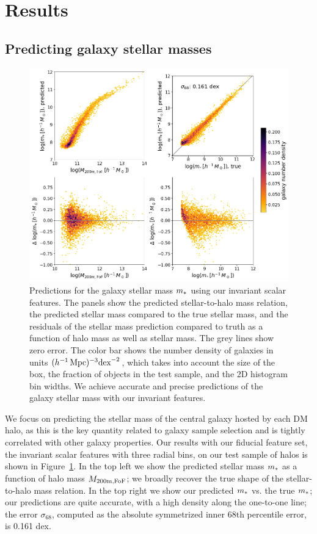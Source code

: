 \section{Results}
\label{sec:results}

\subsection{Predicting galaxy stellar masses}
\label{sec:pred_mstellar}

\begin{figure}
    \centering
    \includegraphics[width=0.7\columnwidth]{pred_mstellar.png}
    \caption{Predictions for the galaxy stellar mass $m_*$ using our invariant scalar features. The panels show the predicted stellar-to-halo mass relation, the predicted stellar mass compared to the true stellar mass, and the residuals of the stellar mass prediction compared to truth as a function of halo mass as well as stellar mass. The grey lines show zero error. The color bar shows the number density of galaxies in units $(h^{-1}\,\mathrm{Mpc})^{-3} \text{dex}^{-2}$, which takes into account the size of the box, the fraction of objects in the test sample, and the 2D histogram bin widths. We achieve accurate and precise predictions of the galaxy stellar mass with our invariant features.}
    \label{fig:mstellar}
\end{figure}

We focus on predicting the stellar mass of the central galaxy hosted by each DM halo, as this is the key quantity related to galaxy sample selection and is tightly correlated with other galaxy properties.
Our results with our fiducial feature set, the invariant scalar features with three radial bins, on our test sample of halos is shown in Figure~\ref{fig:mstellar}. 
In the top left we show the predicted stellar mass $m_*$ as a function of halo mass $M_\mathrm{200m,FoF}$; we broadly recover the true shape of the stellar-to-halo mass relation. 
In the top right we show our predicted $m_*$ vs. the true $m_*$; our predictions are quite accurate, with a high density along the one-to-one line; the error $\sigma_{68}$, computed as the absolute symmetrized inner 68th percentile error, is 0.161 dex.

